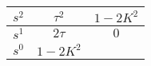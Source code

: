 \begin{tabular}{|c|c|c|}
\hline 
$s^2$ & $ \tau^2 $ & $1-2K^2$ \\
\hline
$s^1$ & $2\tau$ & $0$ \\
\hline
$s^0 $ & $1-2K^2$ & \\
\hline
\end{tabular}
